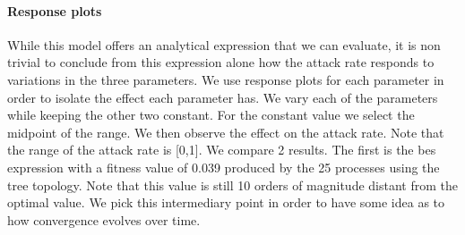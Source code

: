 \paragraph{Response plots}
While this model offers an analytical expression that we can evaluate, it is non trivial to conclude from this expression alone how the attack rate responds to variations in the three parameters. We use response plots for each parameter in order to isolate the effect each parameter has. We vary each of the parameters while keeping the other two constant. For the constant value we select the midpoint of the range. We then observe the effect on the attack rate. Note that the range of the attack rate is [0,1]. 
We compare 2 results. The first is the bes expression with a fitness value of 0.039 produced by the 25 processes using the tree topology. Note that this value is still 10 orders of magnitude distant from the optimal value. We pick this intermediary point in order to have some idea as to how convergence evolves over time.
